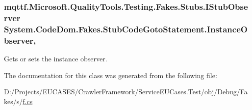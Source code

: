 \hypertarget{class_system_1_1_code_dom_1_1_fakes_1_1_stub_code_goto_statement_ac6e2afbc252e73e72dbbbfbd95f5b52e}{
\subsubsection[{Instance\-Observer}]{\setlength{\rightskip}{0pt plus 5cm}mqttf.\-Microsoft.\-Quality\-Tools.\-Testing.\-Fakes.\-Stubs.\-I\-Stub\-Observer System.\-Code\-Dom.\-Fakes.\-Stub\-Code\-Goto\-Statement.\-Instance\-Observer\hspace{0.3cm}{\ttfamily [get]}, {\ttfamily [set]}}}\label{class_system_1_1_code_dom_1_1_fakes_1_1_stub_code_goto_statement_ac6e2afbc252e73e72dbbbfbd95f5b52e}


Gets or sets the instance observer.



The documentation for this class was generated from the following file\-:\begin{DoxyCompactItemize}
\item 
D\-:/\-Projects/\-E\-U\-C\-A\-S\-E\-S/\-Crawler\-Framework/\-Service\-E\-U\-Cases.\-Test/obj/\-Debug/\-Fakes/s/\hyperlink{s_2f_8cs}{f.\-cs}\end{DoxyCompactItemize}
